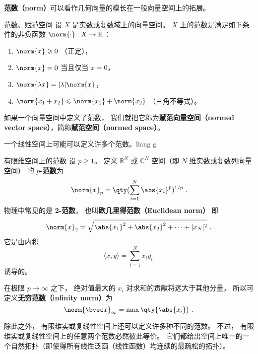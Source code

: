 

\textbf{范数（norm）}可以看作几何向量的模长在一般向量空间上的拓展。
\begin{definition}{范数、赋范空间}\label{def_NormV_1}
设 $X$ 是实数或复数域上的向量空间。 $X$ 上的范数是满足如下条件的非负函数 $\norm{\cdot}: X \to \mathbb{R}$：
\begin{enumerate}
\item $\norm{x} \geqslant 0$ （正定），
\item $\norm{x} = 0$ 当且仅当 $x = 0$，
\item $\norm{\lambda x} = |\lambda|\norm{x}$，
\item $\norm{x_1+x_2} \leqslant \norm{x_1} + \norm{x_2}$ （三角不等式）。
\end{enumerate}
如果一个向量空间中定义了范数， 我们就把它称为\textbf{赋范向量空间（normed vector space）}，简称\textbf{赋范空间（normed space）}。
\end{definition}

一个线性空间上可能可以定义许多个范数。liang g



\begin{example}{有限维空间上的范数}
设 $p\geq 1$。 定义 $\mathbb R^N$ 或 $\mathbb C^N$ 空间（即 $N$ 维实数或复数列向量空间） 的 \textbf{$p$-范数}为
\begin{equation}
\norm{ x}_p = \qty(\sum_{i=1}^N \abs{x_i}^p)^{1/p}~.
\end{equation}
物理中常见的是 \textbf{2-范数}， 也叫\textbf{欧几里得范数（Euclidean norm）} 即
\begin{equation}
\norm{ x}_2 = \sqrt{\abs{x_1}^2 + \abs{x_2}^2 + \dots+|x_N|^2}~.
\end{equation}
它是由内积
$$
\langle x,y\rangle=\sum_{i=1}^Nx_i\bar y_i~
$$
诱导的。

在极限 $p \to \infty$ 之下， 绝对值最大的 $x_i$ 对求和的贡献将远大于其他分量， 所以可定义\textbf{无穷范数（infinity norm）}为
\begin{equation}
\norm{\bvec x}_\infty = \max \qty{\abs{x_i}}~.
\end{equation}

除此之外， 有限维实或复线性空间上还可以定义许多种不同的范数。 不过， 有限维实或复线性空间上的任意两个范数必然彼此等价。 它们都给出空间上唯一的一个自然拓扑（即使得所有线性泛函（线性函数）均连续的最疏松的拓扑）。

\end{example}


